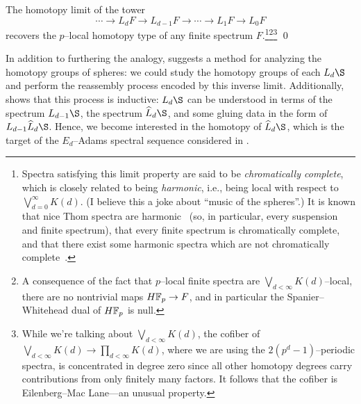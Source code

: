 \begin{theorem}\label{ChromaticConvergence}
The homotopy limit of the tower \[\cdots \to L_d F \to L_{d-1} F \to \cdots \to L_1 F \to L_0 F\] recovers the \(p\)--local homotopy type of any finite spectrum \(F\).\footnote{Spectra satisfying this limit property are said to be \textit{chromatically complete}, which is closely related to being \textit{harmonic}, i.e., being local with respect to \(\bigvee_{d=0}^\infty K(d)\).  (I believe this a joke about ``music of the spheres''.)  It is known that nice Thom spectra are harmonic~\cite{Kriz} (so, in particular, every suspension and finite spectrum), that every finite spectrum is chromatically complete, and that there exist some harmonic spectra which are not chromatically complete~\cite[Section 5.1]{Barthel}.}\footnote{A consequence of the fact that \(p\)--local finite spectra are \(\bigvee_{d < \infty} K(d)\)--local, there are no nontrivial maps \(\HFp \to F\), and in particular the Spanier--Whitehead dual of \(\HFp\) is null.}\footnote{While we're talking about \(\bigvee_{d < \infty} K(d)\), the cofiber of \(\bigvee_{d < \infty} K(d) \to \prod_{d < \infty} K(d)\), where we are using the \(2(p^d-1)\)--periodic spectra, is concentrated in degree zero since all other homotopy degrees carry contributions from only finitely many factors.  It follows that the cofiber is Eilenberg--Mac Lane---an unusual property.} \qed
\end{theorem}

In addition to furthering the analogy,  suggests a method for analyzing the homotopy groups of spheres: we could study the homotopy groups of each \(L_d \S\) and perform the reassembly process encoded by this inverse limit.  Additionally,  shows that this process is inductive: \(L_d \S\) can be understood in terms of the spectrum \(L_{d-1} \S\), the spectrum \(\widehat L_d \S\), and some gluing data in the form of \(L_{d-1} \widehat L_d \S\).  Hence, we become interested in the homotopy of \(\widehat L_d \S\), which is the target of the \(E_d\)--Adams spectral sequence considered in .


